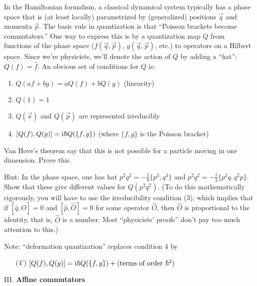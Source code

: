In the Hamiltonian formalism, a classical dynamical system typically has
a phase space that is (at least locally) parametrized by (generalized)
positions $\vec{q}$ and momenta $\vec{p}$. The basic rule in
quantization is that ``Poisson brackets become commutators.'' One way to
express this is by a quantization map $Q$ from functions of the phase
space ($f(\vec{q},\vec{p})$, $g(\vec{q},\vec{p})$, etc.) to operators on
a Hilbert space. Since we're physicists, we'll denote the action of $Q$
by adding a ``hat'': $Q(f)=\widehat{f}$. An obvious set of conditions
for $Q$ is:
\begin{enumerate}[nosep]
\item $Q(af+bg)=aQ(f)+bQ(g)$ (linearity)
\item $Q(1)=1$
\item $Q(\vec{x})$ and $Q(\vec{p})$ are represented irreducibly
\item $[Q(f),Q(g)]=\mathrm{i}\hbar Q(\{f,g\})$ (where $\{f,g\}$ is the Poisson bracket)
\end{enumerate}

Van Hove's theorem say that this is not possible for a particle moving
in one dimension. Prove this.

Hint: In the phase space, one has hat $p^{2}q^{2} = -\frac{1}{9}\{p^{3},q^{3}\}$
and $p^{2}q^{2} = -\frac{1}{3}\{p^{2}q,q^{2}p\}$. Show that these give
different values for $Q(p^{2}q^{2})$. (To do this mathematically
rigorously, you will have to use the irreducibility condition (3), which
implies that if $[\widehat{q},\widehat{O}]=0$ and
$[\widehat{p},\widehat{O}]=0$ for some operator $\widehat{O}$, then
$\widehat{O}$ is proportional to the identity, that is, $\widehat{O}$ is
a number. Most ``physicists' proofs'' don't pay too much attention to
this.)

Note: ``deformation quantization'' replaces condition 4 by
\begin{itemize}
\item[(4')] $[Q(f),Q(g)]=\mathrm{i}\hbar Q(\{f,g\}) + (\mbox{terms of order }\hbar^{2})$
\end{itemize}


\bigbreak\noindent{}III. \textbf{Affine commutators}\bigbreak

